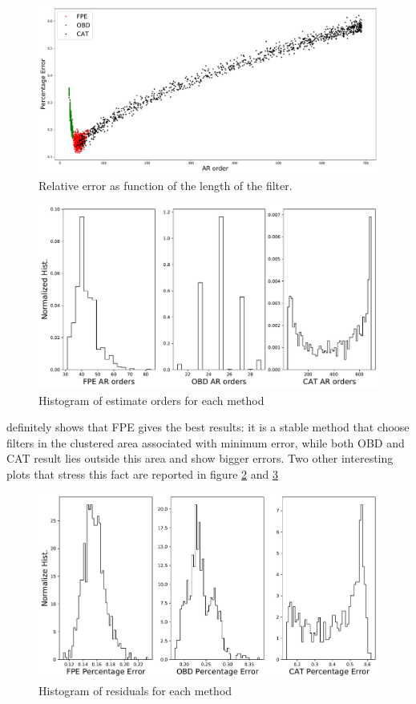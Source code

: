 \documentclass[twocolumn,showpacs,preprintnumbers,nofootinbib,prd,
superscriptaddress,10pt]{revtex4-1}
\begin{document}
\begin{figure}
    \centering
    \includegraphics[width = \linewidth]{Images/NormalPSD/NormalPSDcomparison.pdf}
    \caption{Relative error as function of the length of the filter.}
    \label{fig:optcomparison}
\end{figure}
\begin{figure}
    \hfill
    \centering
    \includegraphics[width = \linewidth]{Images/NormalPSD/ordersComparison.pdf}
    \caption{Histogram of estimate orders for each method}
    \label{fig:ordersCompairson}

\end{figure}
definitely shows that FPE gives the best results: it is a stable method that choose filters in the clustered area associated with minimum error, while both OBD and CAT result lies outside this area and show bigger errors. Two other interesting plots that stress this fact are reported in figure \ref{fig:ordersCompairson} and \ref{fig:residualsComparison}
\begin{figure}
    \centering
    \includegraphics[width = \linewidth]{Images/NormalPSD/ResidualsComparison.pdf}
    \caption{Histogram of residuals for each method}
    \label{fig:residualsComparison}
\end{figure}
\end{document}
